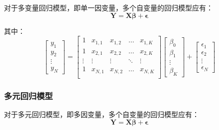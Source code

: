 \documentclass[11pt]{article}
\begin{document}
对于多变量回归模型，即单一因变量，多个自变量的回归模型应有：
\begin{equation*}
    \bm{Y = X \beta + \epsilon}
\end{equation*}

其中：
\begin{equation*}
    \begin{bmatrix}
        y_1 \\
        y_2 \\
        \vdots \\
        y_N
    \end{bmatrix} =
    \begin{bmatrix}
        1 & x_{1,1} & x_{1,2} & \dots & x_{1,K} \\
        1 & x_{2,1} & x_{2,2} & \dots & x_{2,K} \\
        \vdots & \vdots & \vdots & \ddots & \vdots \\
        1 & x_{N,1} & x_{N,2} & \dots & x_{N,K} \\
    \end{bmatrix}
    \begin{bmatrix}
        \beta_0 \\
        \beta_1 \\
        \vdots \\
        \beta_K
    \end{bmatrix} + 
    \begin{bmatrix}
        \epsilon_1 \\
        \epsilon_2 \\
        \vdots \\
        \epsilon_N
    \end{bmatrix}
\end{equation*}

\subsubsection*{多元回归模型}

对于多元回归模型，即多因变量，多个自变量的回归模型应有：
\begin{equation*}
    \bm{Y = X \beta + \epsilon}
\end{equation*}
\end{document}
